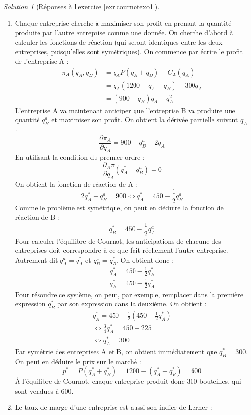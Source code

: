 \documentclass[
]{book}
\providecommand{\tightlist}{%
  \setlength{\itemsep}{0pt}\setlength{\parskip}{0pt}}
\theoremstyle{definition}
\theoremstyle{definition}
\theoremstyle{definition}
\theoremstyle{definition}
\theoremstyle{remark}
\newtheorem*{solution}{Solution}
\begin{document}
\begin{solution}[Réponses à l'exercice \ref{exr:cournotexo1}]
\begin{enumerate}
\def\labelenumi{\arabic{enumi}.}
\tightlist
\item
  Chaque entreprise cherche à maximiser son profit en prenant la quantité produite par l'autre entreprise comme une donnée.
  On cherche d'abord à calculer les fonctions de réaction (qui seront identiques entre les deux entreprises, puisqu'elles sont symétriques).
  On commence par écrire le profit de l'entreprise A :
  \begin{align*}
  \pi_A(q_A, q_B)&=q_AP(q_A+q_B)-C_A(q_A)\\
  &=q_A(1200-q_A-q_B)-300q_A\\
  &=(900-q_B)q_A-q_A^2
  \end{align*}
  L'entreprise A va maintenant anticiper que l'entreprise B va produire une quantité \(q_B^a\) et maximiser son profit.
  On obtient la dérivée partielle suivant \(q_A\) :
  \[\frac{\partial\pi_A}{\partial q_A}=900-q_B^a-2q_A\]
  En utilisant la condition du premier ordre :
  \[\frac{\partial_A\pi}{\partial q_A}(q_A^*+q_B^a)=0\]
  On obtient la fonction de réaction de A :
  \[2q_A^*+q_B^a=900\Leftrightarrow q_A^*=450-\frac{1}{2}q_B^a\]
  Comme le problème est symétrique, on peut en déduire la fonction de réaction de B :
  \[q_B^*=450-\frac{1}{2}q_A^a\]
  Pour calculer l'équilibre de Cournot, les anticipations de chacune des entreprises doit correspondre à ce que fait réellement l'autre entreprise.
  Autrement dit \(q_A^a=q_A^*\) et \(q_B^a=q_B^*\).
  On obtient donc :
  \begin{gather*}
  q_A^*=450-\frac{1}{2}q_B^*\\
  q_B^*=450-\frac{1}{2}q_A^*
  \end{gather*}
  Pour résoudre ce système, on peut, par exemple, remplacer dans la première expression \(q_B^*\) par son expression dans la deuxième.
  On obtient :
  \begin{gather*}
  q_A^*=450-\frac{1}{2}\left(450-\frac{1}{2}q_A^*\right) \\
  \Leftrightarrow \frac{3}{4}q_A^*=450-225\\
  \Leftrightarrow q_A^*=300
  \end{gather*}
  Par symétrie des entreprises A et B, on obtient immédiatement que \(q_B^*=300\).
  On peut en déduire le prix sur le marché :
  \[p^*=P(q_A^*+q_B^*)=1200-(q_A^*+q_B^*)=600\]
  À l'équilibre de Cournot, chaque entreprise produit donc 300 bouteilles, qui sont vendues à 600.
\item
  Le taux de marge d'une entreprise est aussi son indice de Lerner :

\end{enumerate}
\end{solution}
\end{document}
